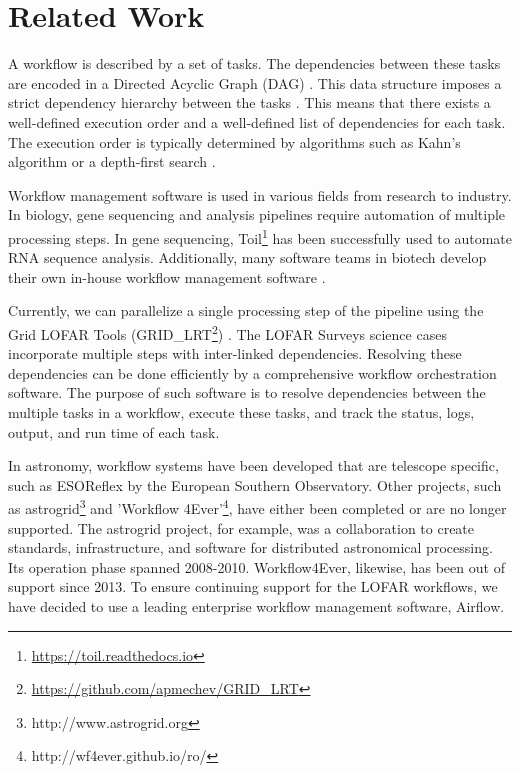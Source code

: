 \section{Related Work}\label{sec:related}

A workflow is described by a set of tasks. The dependencies between these tasks are encoded in a Directed Acyclic Graph (DAG) \cite{dag}. This data structure imposes a strict dependency hierarchy between the tasks \cite{dagalgos}. This means that there exists a well-defined execution order and a well-defined list of dependencies for each task. The execution order is typically determined by algorithms such as Kahn's algorithm \cite{Kahn} or a depth-first search \cite{dfs}.

Workflow management software is used in various fields from research to industry. In biology, gene sequencing and analysis pipelines require automation of multiple processing steps. In gene sequencing, Toil\footnote{\url{https://toil.readthedocs.io}} has been successfully used to automate RNA sequence analysis\cite{toil}. Additionally, many  software teams in biotech develop their own in-house workflow management software \cite{nextflow}.  


Currently, we can parallelize a single processing step of the pipeline using the Grid LOFAR Tools (GRID\_LRT\footnote{\url{https://github.com/apmechev/GRID_LRT}}) \cite{mechev}. The LOFAR Surveys science cases incorporate multiple steps with inter-linked dependencies. Resolving these dependencies can be done efficiently by a comprehensive workflow orchestration software. The purpose of such software is to resolve dependencies between the multiple tasks in a workflow, execute these tasks, and track the status, logs, output, and run time of each task. 

In astronomy, workflow systems have been developed that are telescope specific, such as ESOReflex\cite{reflex} by the European Southern Observatory. Other projects, such as astrogrid\footnote{http://www.astrogrid.org} and 'Workflow 4Ever'\footnote{http://wf4ever.github.io/ro/}, have either been completed or are no longer supported. The astrogrid project, for example, was a collaboration to create standards, infrastructure, and software for distributed astronomical processing. Its operation phase spanned 2008-2010. Workflow4Ever, likewise, has been out of support since 2013. To ensure continuing support for the LOFAR workflows, we have decided to use a leading enterprise workflow management software, Airflow.


